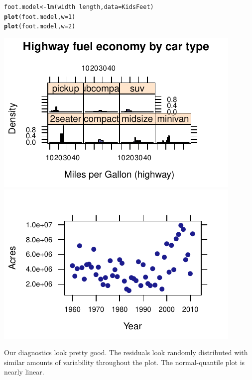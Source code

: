\documentclass[twoside]{book}
\makeatletter
\def\maxwidth{ %
  \ifdim\Gin@nat@width>\linewidth
    \linewidth
  \else
    \Gin@nat@width
  \fi
}
\newcommand{\hlnum}[1]{\textcolor[rgb]{0.686,0.059,0.569}{#1}}%
\newcommand{\hlopt}[1]{\textcolor[rgb]{0,0,0}{#1}}%
\newcommand{\hlstd}[1]{\textcolor[rgb]{0.345,0.345,0.345}{#1}}%
\newcommand{\hlkwb}[1]{\textcolor[rgb]{0.69,0.353,0.396}{#1}}%
\newcommand{\hlkwc}[1]{\textcolor[rgb]{0.333,0.667,0.333}{#1}}%
\newcommand{\hlkwd}[1]{\textcolor[rgb]{0.737,0.353,0.396}{\textbf{#1}}}%
\newenvironment{kframe}{%
 \def\at@end@of@kframe{}%
 \ifinner\ifhmode%
  \def\at@end@of@kframe{\end{minipage}}%
  \begin{minipage}{\columnwidth}%
 \fi\fi%
 \def\FrameCommand##1{\hskip\@totalleftmargin \hskip-\fboxsep
 \colorbox{shadecolor}{##1}\hskip-\fboxsep
     \hskip-\linewidth \hskip-\@totalleftmargin \hskip\columnwidth}%
 \MakeFramed {\advance\hsize-\width
   \@totalleftmargin\z@ \linewidth\hsize
   \@setminipage}}%
 {\par\unskip\endMakeFramed%
 \at@end@of@kframe}
\newenvironment{knitrout}{}{} %
\makeatother
\begin{document}
\begin{solution}
\begin{knitrout}
\color{fgcolor}\begin{kframe}
\begin{alltt}
\hlstd{foot.model} \hlkwb{<-} \hlkwd{lm}\hlstd{(width} \hlopt{~} \hlstd{length,} \hlkwc{data} \hlstd{= KidsFeet)}
\hlkwd{plot}\hlstd{(foot.model,} \hlkwc{w} \hlstd{=} \hlnum{1}\hlstd{)}
\hlkwd{plot}\hlstd{(foot.model,} \hlkwc{w} \hlstd{=} \hlnum{2}\hlstd{)}
\end{alltt}
\end{kframe}

{\centering \includegraphics[width=\maxwidth]{figures/fig-unnamed-chunk-28-1} 
\includegraphics[width=\maxwidth]{figures/fig-unnamed-chunk-28-2} 

}



\end{knitrout}
Our diagnostics look pretty good.  The residuals look randomly distributed with
similar amounts of variability throughout the plot.  The normal-quantile plot
is nearly linear.


\end{solution}
\end{document}
